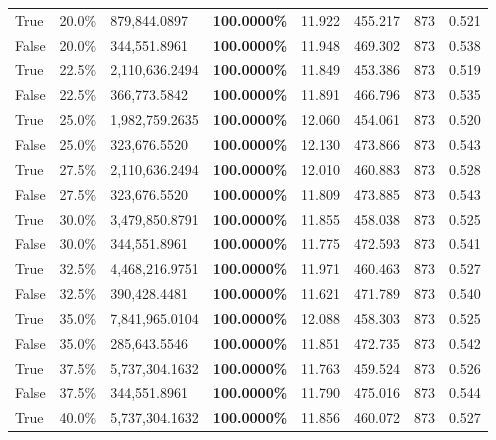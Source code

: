 \begin{table}[H]
{\begin{tabular}{lllrllll}
\cline{1-8}
True & 20.0\% & 879,844.0897 & \bfseries \color{red} 100.0000\% & 11.922 & 455.217 & 873 & 0.521 \\
\cline{1-8}
False & 20.0\% & 344,551.8961 & \bfseries \color{red} 100.0000\% & 11.948 & 469.302 & 873 & 0.538 \\
\cline{1-8}
True & 22.5\% & 2,110,636.2494 & \bfseries \color{red} 100.0000\% & 11.849 & 453.386 & 873 & 0.519 \\
\cline{1-8}
False & 22.5\% & 366,773.5842 & \bfseries \color{red} 100.0000\% & 11.891 & 466.796 & 873 & 0.535 \\
\cline{1-8}
True & 25.0\% & 1,982,759.2635 & \bfseries \color{red} 100.0000\% & 12.060 & 454.061 & 873 & 0.520 \\
\cline{1-8}
False & 25.0\% & 323,676.5520 & \bfseries \color{red} 100.0000\% & 12.130 & 473.866 & 873 & 0.543 \\
\cline{1-8}
True & 27.5\% & 2,110,636.2494 & \bfseries \color{red} 100.0000\% & 12.010 & 460.883 & 873 & 0.528 \\
\cline{1-8}
False & 27.5\% & 323,676.5520 & \bfseries \color{red} 100.0000\% & 11.809 & 473.885 & 873 & 0.543 \\
\cline{1-8}
True & 30.0\% & 3,479,850.8791 & \bfseries \color{red} 100.0000\% & 11.855 & 458.038 & 873 & 0.525 \\
\cline{1-8}
False & 30.0\% & 344,551.8961 & \bfseries \color{red} 100.0000\% & 11.775 & 472.593 & 873 & 0.541 \\
\cline{1-8}
True & 32.5\% & 4,468,216.9751 & \bfseries \color{red} 100.0000\% & 11.971 & 460.463 & 873 & 0.527 \\
\cline{1-8}
False & 32.5\% & 390,428.4481 & \bfseries \color{red} 100.0000\% & 11.621 & 471.789 & 873 & 0.540 \\
\cline{1-8}
True & 35.0\% & 7,841,965.0104 & \bfseries \color{red} 100.0000\% & 12.088 & 458.303 & 873 & 0.525 \\
\cline{1-8}
False & 35.0\% & 285,643.5546 & \bfseries \color{red} 100.0000\% & 11.851 & 472.735 & 873 & 0.542 \\
\cline{1-8}
True & 37.5\% & 5,737,304.1632 & \bfseries \color{red} 100.0000\% & 11.763 & 459.524 & 873 & 0.526 \\
\cline{1-8}
False & 37.5\% & 344,551.8961 & \bfseries \color{red} 100.0000\% & 11.790 & 475.016 & 873 & 0.544 \\
\cline{1-8}
True & 40.0\% & 5,737,304.1632 & \bfseries \color{red} 100.0000\% & 11.856 & 460.072 & 873 & 0.527 \\

\end{tabular}}
\end{table}
